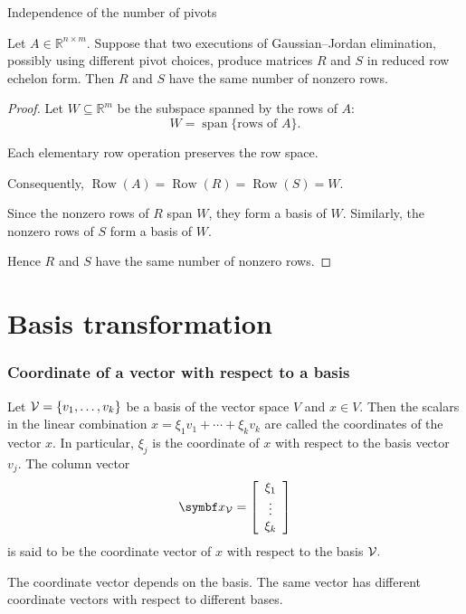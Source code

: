 \begin{frame}{Independence of the number of pivots}

\begin{theorem}
Let \(A\in \mathbb{R}^{n\times m}\). Suppose that two executions of
Gaussian--Jordan elimination, possibly using different pivot choices,
produce matrices \(R\) and \(S\) in reduced row echelon form. Then \(R\) and
\(S\) have the same number of nonzero rows.
\end{theorem}

\begin{proof}
Let \(W\subseteq \mathbb{R}^m\) be the subspace spanned by the rows of
\(A\):
\[
W=\operatorname{span}\{\text{rows of }A\}.
\]

Each elementary row operation preserves the row space.

Consequently,
\(
\operatorname{Row}(A)=\operatorname{Row}(R)=\operatorname{Row}(S)=W.
\)

Since the nonzero rows of \(R\) span \(W\), they form a basis of \(W\).
Similarly, the nonzero rows of \(S\) form a basis of \(W\).

Hence \(R\) and \(S\) have the same number of nonzero rows.
\end{proof}

\end{frame}
\section{Basis transformation}
\begin{frame}\frametitle{Coordinate of a vector with respect to a basis}
\begin{definition}
Let ${\cal V}=\{v_1,\ldots ,v_k\}$ be a basis of the vector space $V$ and $x\in V.$ Then the scalars in the linear combination $x=\xi_1v_1+\cdots +\xi_kv_k$ are called the coordinates of the vector $x.$ In particular, $\xi_j$ is the coordinate of $x$ with respect to the basis vector $v_j.$ The column vector 
$$\mathbf{x}_{\cal V}=\left[\begin{array}{c}
\xi_1\\
\vdots \\
\xi_k
\end{array}\right]$$
is said to be the coordinate vector of $x$ with respect to the basis ${\cal V}.$
\end{definition}

The coordinate vector depends on the basis. The same vector has different coordinate vectors with respect to different bases.
\end{frame}

